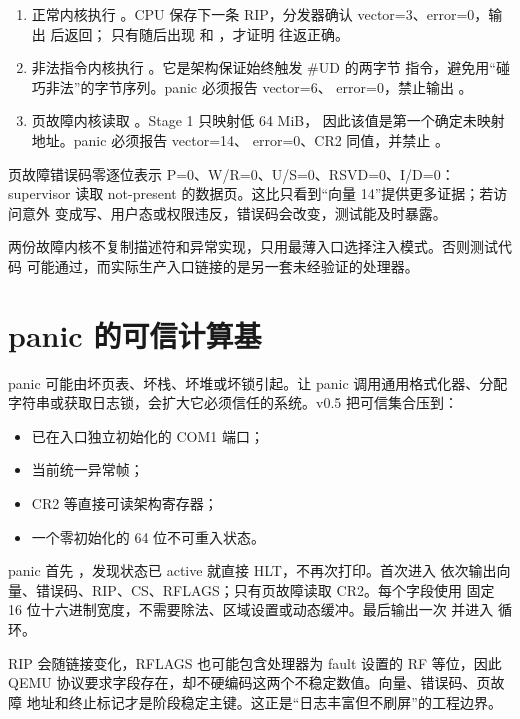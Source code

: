\begin{enumerate}
  \item 正常内核执行 。CPU 保存下一条 RIP，分发器确认
        vector=3、error=0，输出  后返回；
        只有随后出现  和
        ，才证明  往返正确。
  \item 非法指令内核执行 。它是架构保证始终触发 \#UD 的两字节
        指令，避免用“碰巧非法”的字节序列。panic 必须报告 vector=6、
        error=0，禁止输出 。
  \item 页故障内核读取 。Stage 1 只映射低 64 MiB，
        因此该值是第一个确定未映射地址。panic 必须报告 vector=14、
        error=0、CR2 同值，并禁止 。
\end{enumerate}

页故障错误码零逐位表示 P=0、W/R=0、U/S=0、RSVD=0、I/D=0：supervisor
读取 not-present 的数据页。这比只看到“向量 14”提供更多证据；若访问意外
变成写、用户态或权限违反，错误码会改变，测试能及时暴露。

两份故障内核不复制描述符和异常实现，只用最薄入口选择注入模式。否则测试代码
可能通过，而实际生产入口链接的是另一套未经验证的处理器。

\section{panic 的可信计算基}

panic 可能由坏页表、坏栈、坏堆或坏锁引起。让 panic 调用通用格式化器、分配
字符串或获取日志锁，会扩大它必须信任的系统。v0.5 把可信集合压到：

\begin{itemize}
  \item 已在入口独立初始化的 COM1 端口；
  \item 当前统一异常帧；
  \item CR2 等直接可读架构寄存器；
  \item 一个零初始化的 64 位不可重入状态。
\end{itemize}

panic 首先 ，发现状态已 active 就直接 HLT，不再次打印。首次进入
依次输出向量、错误码、RIP、CS、RFLAGS；只有页故障读取 CR2。每个字段使用
固定 16 位十六进制宽度，不需要除法、区域设置或动态缓冲。最后输出一次
 并进入  循环。

RIP 会随链接变化，RFLAGS 也可能包含处理器为 fault 设置的 RF 等位，因此
QEMU 协议要求字段存在，却不硬编码这两个不稳定数值。向量、错误码、页故障
地址和终止标记才是阶段稳定主键。这正是“日志丰富但不刷屏”的工程边界。

